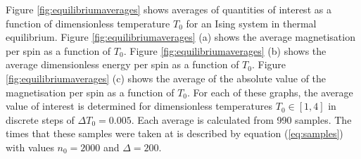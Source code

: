 \documentclass[11pt]{iopart}
\begin{document}
Figure \ref{fig:equilibriumaverages} shows averages of quantities of interest as a function of dimensionless temperature $T_0$ for an Ising system in thermal equilibrium. Figure \ref{fig:equilibriumaverages} (a) shows the average magnetisation per spin as a function of $T_0$. Figure \ref{fig:equilibriumaverages} (b) shows the average dimensionless energy per spin as a function of $T_0$. Figure \ref{fig:equilibriumaverages} (c) shows the average of the absolute value of the magnetisation per spin as a function of $T_0$. For each of these graphs, the average value of interest is determined for dimensionless temperatures $T_0 \in [1, 4]$ in discrete steps of $\Delta T_0 = 0.005$. Each average is calculated from 990 samples. The times that these samples were taken at is described by equation (\ref{eq:samples}) with values $n_0 = 2000$ and $\Delta = 200$.
\end{document}
